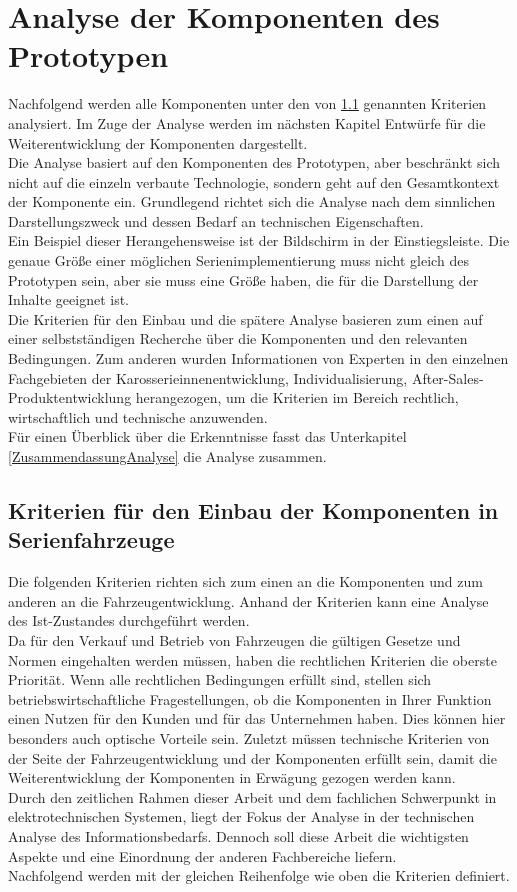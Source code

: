 \chapter{Analyse der Komponenten des Prototypen}
\label{cha:Analyse}
Nachfolgend werden alle Komponenten unter den von \ref{cha:Kriterien} genannten Kriterien analysiert. Im Zuge der Analyse werden im nächsten Kapitel Entwürfe für die Weiterentwicklung der Komponenten dargestellt.\\
Die Analyse basiert auf den Komponenten des Prototypen, aber beschränkt sich nicht auf die einzeln verbaute Technologie, sondern geht auf den Gesamtkontext der Komponente ein. Grundlegend richtet sich die Analyse nach dem sinnlichen Darstellungszweck und dessen Bedarf an technischen Eigenschaften. \\
Ein Beispiel dieser Herangehensweise ist der Bildschirm in der Einstiegsleiste. Die genaue Größe einer möglichen Serienimplementierung muss nicht gleich des Prototypen sein, aber sie muss eine Größe haben, die für die Darstellung der Inhalte geeignet ist.\\
Die Kriterien für den Einbau und die spätere Analyse basieren zum einen auf einer selbstständigen Recherche über die Komponenten und den relevanten Bedingungen. Zum anderen wurden Informationen von Experten in den einzelnen Fachgebieten der Karosserieinnenentwicklung, Individualisierung, After-Sales-Produktentwicklung herangezogen, um die Kriterien im Bereich rechtlich, wirtschaftlich und technische anzuwenden. \\
Für einen Überblick über die Erkenntnisse fasst das Unterkapitel \ref{ZusammendassungAnalyse} die Analyse zusammen.
\section{Kriterien für den Einbau der Komponenten in Serienfahrzeuge}
\label{cha:Kriterien}
Die folgenden Kriterien richten sich zum einen an die Komponenten und zum anderen an die Fahrzeugentwicklung. Anhand der Kriterien kann eine Analyse des Ist-Zustandes durchgeführt werden.\\
Da für den Verkauf und Betrieb von Fahrzeugen die gültigen Gesetze und Normen eingehalten werden müssen, haben die rechtlichen Kriterien die oberste Priorität. Wenn alle rechtlichen Bedingungen erfüllt sind, stellen sich betriebswirtschaftliche Fragestellungen, ob die Komponenten in Ihrer Funktion einen Nutzen für den Kunden und für das Unternehmen haben. Dies können hier besonders auch optische Vorteile sein. Zuletzt müssen technische Kriterien von der Seite der Fahrzeugentwicklung und der Komponenten erfüllt sein, damit die Weiterentwicklung der Komponenten in Erwägung gezogen werden kann. \\
Durch den zeitlichen Rahmen dieser Arbeit und dem fachlichen Schwerpunkt in elektrotechnischen Systemen, liegt der Fokus der Analyse in der technischen Analyse des Informationsbedarfs. Dennoch soll diese Arbeit die wichtigsten Aspekte und eine Einordnung der anderen Fachbereiche liefern.\\
Nachfolgend werden mit der gleichen Reihenfolge wie oben die Kriterien definiert.
